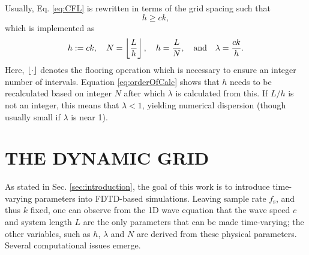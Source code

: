 \documentclass[fleqn]{jaes}
\begin{document}
Usually, Eq. \eqref{eq:CFL} is rewritten in terms of the grid spacing such that
\begin{equation}\label{eq:stabilityCond}
    h \geq c k,
\end{equation}
which is implemented as
\begin{equation}\label{eq:orderOfCalc}
    h:=ck, \quad N = \floor[\frac{L}{h}],\quad h = \frac{L}{N},\qaq \lambda = \frac{ck}{h}.
\end{equation}
Here, $\floor[\cdot]$ denotes the flooring operation which is necessary to ensure an integer number of intervals. Equation \eqref{eq:orderOfCalc} shows that $h$ needs to be recalculated based on integer $N$ after which $\lambda$ is calculated from this. If $L/h$ is not an integer, this means that $\lambda < 1$, yielding numerical dispersion (though usually small if $\lambda$ is near 1).

\section{THE DYNAMIC GRID}\label{sec:dynamicGrid}
As stated in Sec. \ref{sec:introduction}, the goal of this work is to introduce time-varying parameters into FDTD-based simulations. 
Leaving sample rate $f_\text{s}$, and thus $k$ fixed, one can observe from the 1D wave equation that the wave speed $c$ and system length $L$ are the only parameters that can be made time-varying; the other variables, such as $h$, $\lambda$ and $N$ are derived from these physical parameters. Several computational issues emerge. 
\end{document}
